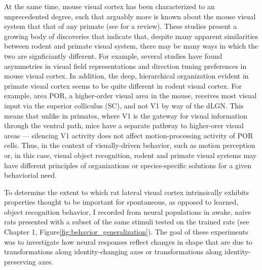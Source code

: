 At the same time, mouse visual cortex has been characterized to an unprecedented degree, such that arguably more is known about the mouse visual system that that of any primate (see \cite{Niell2021} for a review). These studies present a growing body of discoveries that indicate that, despite many apparent similarities between rodent and primate visual system, there may be many ways in which the two are signficiantly different. For example, several studies have found asymmetries in visual field representations and direction tuning preferences in mouse visual cortex\cite{Zhuang2017, Liang2018, Sit2020, Murgas2020}. In addition, the deep, hierarchical organization evident in primate visual cortex seems to be quite different in rodent visual cortex. For example, area POR, a higher-order visual area in the mouse, receives most visual input via the superior colliculus (SC), and not V1 by way of the dLGN\cite{Beltramo2019a}. This means that unlike in primates, where V1 is the gateway for visual information through the ventral path, mice have a separate pathway to higher-orer visual areas --- silencing V1 activity does not affect motion-processing activity of POR cells. Thus, in the context of visually-driven behavior, such as motion perception or, in this case, visual object recognition, rodent and primate visual systems may have different principles of organizations or species-specific solutions for a given behaviorial need. 

To determine the extent to which rat lateral visual cortex intrinsically exhibits properties thought to be important for spontaneous, as opposed to learned, object recognition behavior, I recorded from neural populations in awake, naive rats presented with a subset of the same stimuli tested on the trained rats (see Chapter 1, Figure\ref{fig:behavior_generalization}). The goal of these experiments was to investigate how neural responses reflect changes in shape that are due to transformations along identity-changing axes or transformations along identity-preserving axes.

